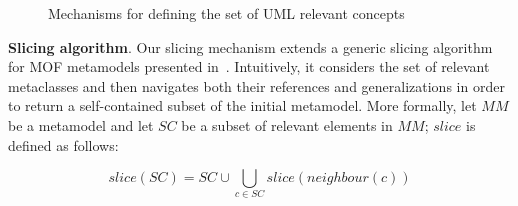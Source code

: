 \begin{figure}
	\hspace{2mm}
  \caption{Mechanisms for defining the set of UML relevant concepts}
  \label{fig:slicingIdea}
\end{figure}
%
\vspace{-.6cm}

\textbf{Slicing algorithm}. Our slicing mechanism
extends a generic slicing algorithm for MOF metamodels presented in~\cite{ICSEbyadl}. Intuitively,
it considers the set of relevant metaclasses and then navigates both their references and generalizations in order
to return a self-contained subset of the initial metamodel.
More formally, let $MM$ be a metamodel and let $SC$ be a subset of relevant elements in
$MM$; $slice$ is defined as follows:

\vspace{-.2cm}
$$slice(SC)=SC \cup \displaystyle\bigcup_{c \in
SC}{slice(neighbour(c))}$$
\vspace{-.2cm}

